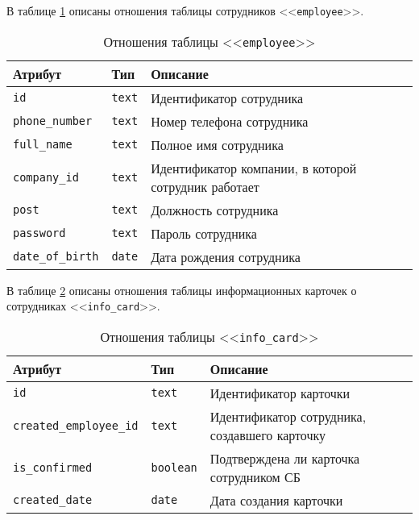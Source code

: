 \clearpage

В таблице \ref{table:employeeCols} описаны отношения таблицы сотрудников <<\texttt{employee}>>.
\begin{table}[h!]
	\begin{center}
	\caption{\label{table:employeeCols} Отношения таблицы <<\texttt{employee}>>}
		\begin{tabularx}{\textwidth}{|X|X|X|}
			\hline
			Атрибут & Тип & Описание \\ \hline
			\texttt{id} & \texttt{text} & Идентификатор сотрудника \\ \hline
			\texttt{phone\_number} & \texttt{text} & Номер телефона сотрудника \\ \hline
			\texttt{full\_name} & \texttt{text} & Полное имя сотрудника \\ \hline
			\texttt{company\_id} & \texttt{text} & Идентификатор компании, в которой сотрудник работает \\ \hline
			\texttt{post} & \texttt{text} & Должность сотрудника\\ \hline
			\texttt{password} & \texttt{text} & Пароль сотрудника \\ \hline
			\texttt{date\_of\_birth} & \texttt{date} & Дата рождения сотрудника \\ \hline
		\end{tabularx}
	\end{center}
\end{table}

В таблице \ref{table:infoCardCols} описаны отношения таблицы информационных карточек о сотрудниках <<\texttt{info\_card}>>.
\begin{table}[h!]
	\begin{center}
	\caption{\label{table:infoCardCols} Отношения таблицы <<\texttt{info\_card}>>}
		\begin{tabularx}{\textwidth}{|X|X|X|}
			\hline
			Атрибут & Тип & Описание \\ \hline
			\texttt{id} & \texttt{text} & Идентификатор карточки \\ \hline
			\texttt{created\_employee\_id} & \texttt{text} & Идентификатор сотрудника, создавшего карточку \\ \hline
			\texttt{is\_confirmed} & \texttt{boolean} & Подтверждена ли карточка сотрудником СБ \\ \hline
			\texttt{created\_date} & \texttt{date} & Дата создания карточки \\ \hline
		\end{tabularx}
	\end{center}
\end{table}


